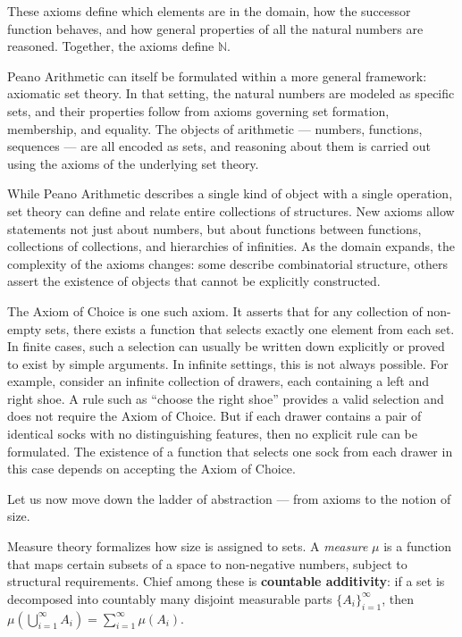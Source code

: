 These axioms define which elements are in the domain, how the successor function behaves, and how general properties of all the natural numbers are reasoned. Together, the axioms define $\mathbb{N}$.

Peano Arithmetic can itself be formulated within a more general framework: axiomatic set theory. In that setting, the natural numbers are modeled as specific sets, and their properties follow from axioms governing set formation, membership, and equality. The objects of arithmetic — numbers, functions, sequences — are all encoded as sets, and reasoning about them is carried out using the axioms of the underlying set theory.

While Peano Arithmetic describes a single kind of object with a single operation, set theory can define and relate entire collections of structures. New axioms allow statements not just about numbers, but about functions between functions, collections of collections, and hierarchies of infinities. As the domain expands, the complexity of the axioms changes: some describe combinatorial structure, others assert the existence of objects that cannot be explicitly constructed.

The Axiom of Choice is one such axiom. It asserts that for any collection of non-empty sets, there exists a function that selects exactly one element from each set. In finite cases, such a selection can usually be written down explicitly or proved to exist by simple arguments. In infinite settings, this is not always possible. For example, consider an infinite collection of drawers, each containing a left and right shoe. A rule such as “choose the right shoe” provides a valid selection and does not require the Axiom of Choice. But if each drawer contains a pair of identical socks with no distinguishing features, then no explicit rule can be formulated. The existence of a function that selects one sock from each drawer in this case depends on accepting the Axiom of Choice.

Let us now move down the ladder of abstraction — from axioms to the notion of size.

Measure theory formalizes how size is assigned to sets. A \emph{measure} $\mu$ is a function that maps certain subsets of a space to non-negative numbers, subject to structural requirements. Chief among these is \textbf{countable additivity}: if a set is decomposed into countably many disjoint measurable parts $\{A_i\}_{i=1}^\infty$, then $\mu\left( \bigcup_{i=1}^\infty A_i \right) = \sum_{i=1}^\infty \mu(A_i)$.

